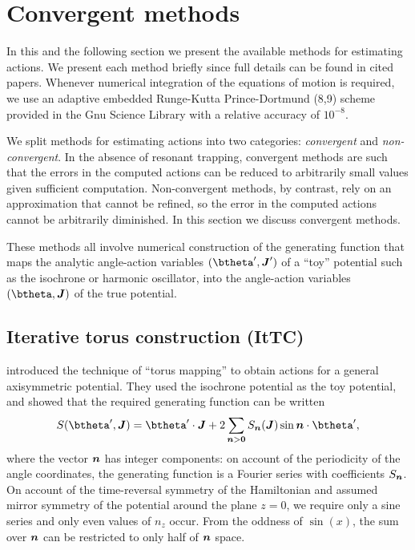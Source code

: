 \documentclass[useAMS,usenatbib,fleqn,a4paper]{mn2e}
\newcommand{\bs}[1]{\bmath{#1}}
\begin{document}
\section{Convergent methods}\label{Sect::MethodsC}

In this and the following section we present the available methods for
estimating actions.  We present each method briefly since full details can be
found in cited papers. Whenever numerical integration of the equations of
motion is required, we use an adaptive embedded Runge-Kutta Prince-Dortmund
(8,9) scheme provided in the Gnu Science Library \citep{GSL} with a relative
accuracy of $10^{-8}$.

We split methods for estimating actions into two categories:
\emph{convergent} and \emph{non-convergent}. In the absence of resonant
trapping, convergent methods are such that the errors in the computed actions
can be reduced to arbitrarily small values given sufficient computation.
Non-convergent methods, by contrast, rely on an approximation that cannot be
refined, so the error in the computed actions cannot be arbitrarily
diminished. In this section we discuss convergent methods.

These methods all involve numerical construction of the generating function that maps
the analytic angle-action variables $(\btheta',\boldsymbol{J}')$ of a ``toy''
potential such as the isochrone or harmonic oscillator, into the angle-action
variables $(\btheta,\boldsymbol{J})$ of the true potential.

\subsection{Iterative torus construction (ItTC)}\label{Method::ItTorus}

\cite{McGillBinney} introduced the technique of ``torus mapping'' to obtain
actions for a general axisymmetric potential. They used
the isochrone potential as the toy potential, and showed that the required
generating function can be written
\begin{equation}\label{eq:genGF}
S(\btheta',\bs{J}) = \btheta'\cdot\bs{J}
+2 \sum_{\bs{n}>\bs{0}}S_{\bs{n}}(\bs{J})\sin\bs{n}\cdot\btheta',
\end{equation}
where the vector $\bs{n}$ has integer components: on account of the
periodicity of the angle coordinates, the generating function is a Fourier
series with coefficients $S_{\bs{n}}$. On account of the time-reversal
symmetry of the Hamiltonian and assumed mirror symmetry of the potential
around the plane $z=0$, we require only a sine series and only even values of
$n_z$ occur. From the oddness of $\sin(x)$, the sum over $\bs{n}$ can be
restricted to only half of $\bs{n}$ space.
\end{document}
